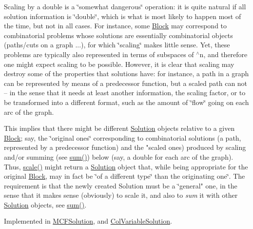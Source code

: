 Scaling by a double is a \char`\"{}somewhat dangerous\char`\"{} operation\+: it is quite natural if all solution information is \char`\"{}double\char`\"{}, which is what is most likely to happen most of the time, but not in all cases. For instance, some \mbox{\hyperlink{class_s_m_spp__di__unipi__it_1_1_block}{Block}} may correspond to combinatorial problems whose solutions are essentially combinatorial objects (paths/cuts on a graph ...), for which \char`\"{}scaling\char`\"{} makes little sense. Yet, these problems are typically also represented in terms of subspaces of $^\wedge$n, and therefore one might expect scaling to be possible. However, it is clear that scaling may destroy some of the properties that solutions have\+: for instance, a path in a graph can be represented by means of a predecessor function, but a scaled path can not -- in the sense that it needs at least another information, the scaling factor, or to be transformed into a different format, such as the amount of \char`\"{}flow\char`\"{} going on each arc of the graph.

This implies that there might be different \mbox{\hyperlink{class_s_m_spp__di__unipi__it_1_1_solution}{Solution}} objects relative to a given \mbox{\hyperlink{class_s_m_spp__di__unipi__it_1_1_block}{Block}}; say, the \char`\"{}original ones\char`\"{} corresponding to combinatorial solutions (a path, represented by a predecessor function) and the "scaled ones) produced by scaling and/or summing (see \mbox{\hyperlink{class_s_m_spp__di__unipi__it_1_1_solution_adc2450947fd142657637bf79d91505a9}{sum()}}) below (say, a double for each arc of the graph). Thus, \mbox{\hyperlink{class_s_m_spp__di__unipi__it_1_1_solution_abf1a2d1763f128a72b2677d4b9ff4d3b}{scale()}} might return a \mbox{\hyperlink{class_s_m_spp__di__unipi__it_1_1_solution}{Solution}} object that, while being appropriate for the original \mbox{\hyperlink{class_s_m_spp__di__unipi__it_1_1_block}{Block}}, may in fact be \char`\"{}of
a different type\char`\"{} than the originating one\char`\"{}. The requirement is that the
newly created Solution must be a \char`\"{}general" one, in the sense that it makes sense (obviously) to scale it, and also to {\itshape sum} it with other \mbox{\hyperlink{class_s_m_spp__di__unipi__it_1_1_solution}{Solution}} objects, see \mbox{\hyperlink{class_s_m_spp__di__unipi__it_1_1_solution_adc2450947fd142657637bf79d91505a9}{sum()}}. 

Implemented in \mbox{\hyperlink{class_s_m_spp__di__unipi__it_1_1_m_c_f_solution_a2c818cbb6d8b22f839a7f7336f6b382b}{M\+C\+F\+Solution}}, and \mbox{\hyperlink{class_s_m_spp__di__unipi__it_1_1_col_variable_solution_ae540e7cdfd7d10111ae795606dfa58e2}{Col\+Variable\+Solution}}.

